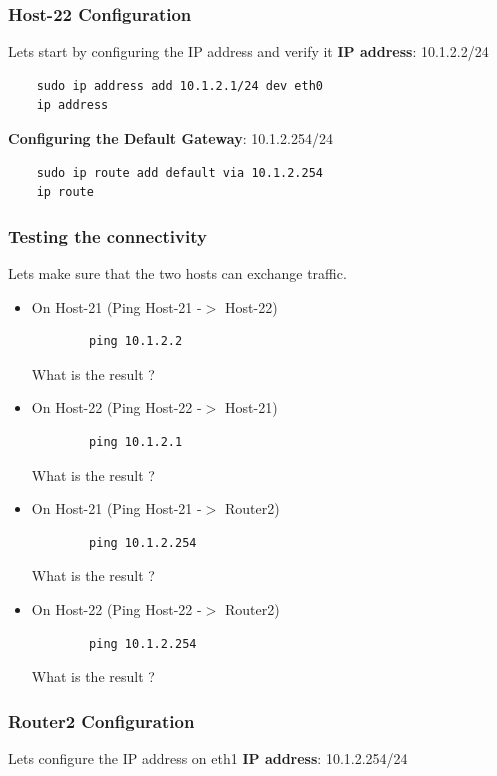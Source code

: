 \subsubsection{Host-22 Configuration}
Lets start by configuring the IP address and verify it
\textbf{IP address}: 10.1.2.2/24

\begin{verbatim}
    sudo ip address add 10.1.2.1/24 dev eth0
    ip address
\end{verbatim}

\textbf{Configuring the Default Gateway}: 10.1.2.254/24

\begin{verbatim}
    sudo ip route add default via 10.1.2.254
    ip route
\end{verbatim}

\subsubsection{Testing the connectivity}
Lets make sure that the two hosts can exchange traffic.
\newline
\begin{itemize}
	\item On Host-21 (Ping Host-21 -$>$ Host-22)
	\begin{verbatim}
	    ping 10.1.2.2
	\end{verbatim}

	What is the result ?
	\item On Host-22 (Ping Host-22 -$>$ Host-21)
	\begin{verbatim}
	    ping 10.1.2.1
	\end{verbatim}

	What is the result ?
	\item On Host-21 (Ping Host-21 -$>$ Router2)
	\begin{verbatim}
	    ping 10.1.2.254
	\end{verbatim}

	What is the result ?
	\item On Host-22 (Ping Host-22 -$>$ Router2)
	\begin{verbatim}
	    ping 10.1.2.254
	\end{verbatim}

	What is the result ?
\end{itemize}


\subsubsection{Router2 Configuration}
Lets configure the IP address on eth1
\textbf{IP address}: 10.1.2.254/24

